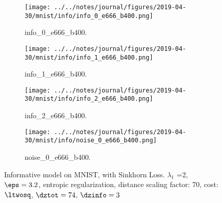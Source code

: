 \begin{figure}[!htbp]
   \centering
\begin{subfigure}[t]{0.48\textwidth}
   \texttt{[image: ../../notes/journal/figures/2019-04-30/mnist/info/info\_0\_e666\_b400.png]}
   \caption{info_0_e666_b400.}
   \label{fig:.._.._notes_journal_figures_2019-04-30_mnist_info-a}
\end{subfigure}
\begin{subfigure}[t]{0.48\textwidth}
   \texttt{[image: ../../notes/journal/figures/2019-04-30/mnist/info/info\_1\_e666\_b400.png]}
   \caption{info_1_e666_b400.}
   \label{fig:.._.._notes_journal_figures_2019-04-30_mnist_info-b}
\end{subfigure}
\begin{subfigure}[t]{0.48\textwidth}
   \texttt{[image: ../../notes/journal/figures/2019-04-30/mnist/info/info\_2\_e666\_b400.png]}
   \caption{info_2_e666_b400.}
   \label{fig:.._.._notes_journal_figures_2019-04-30_mnist_info-c}
\end{subfigure}
\begin{subfigure}[t]{0.48\textwidth}
   \texttt{[image: ../../notes/journal/figures/2019-04-30/mnist/info/noise\_0\_e666\_b400.png]}
   \caption{noise_0_e666_b400.}
   \label{fig:.._.._notes_journal_figures_2019-04-30_mnist_info-d}
\end{subfigure}
   \caption{Informative model on MNIST, with Sinkhorn Loss. $\lambda_1$ =2, $\eps=3.2$, entropic regularization, distance scaling factor: 70, cost: $\ltwosq$, $\dztot = 74$, $\dzinfo = 3$}
   \label{fig:.._.._notes_journal_figures_2019-04-30_mnist_info}
\end{figure}